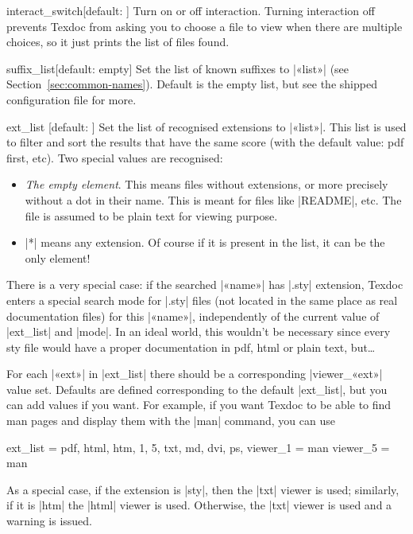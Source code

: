 \documentclass{texdoc-doc}
\begin{document}
\begin{confitem}{interact\_switch}{}[default: ]
Turn on or off interaction. Turning interaction off prevents Texdoc from asking
you to choose a file to view when there are multiple choices, so it just prints
the list of files found.
\end{confitem}

\begin{confitem}{suffix\_list}{}[default: empty]
Set the list of known suffixes to |«list»| (see
Section~\ref{sec:common-names}). Default is the empty list, but see the
shipped configuration file for more.
\end{confitem}

\begin{confitem}{ext\_list}
  {}[default: ]
Set the list of recognised extensions to |«list»|. This list is used to filter
and  sort the results that have the same score (with the default value: pdf
first, etc). Two special values are recognised:
%
\begin{itemize}
\item \emph{The empty element}. This means files without extensions, or more
  precisely without a dot in their name. This is meant for files like
  |README|, etc. The file is assumed to be plain text for viewing purpose.
\item |*| means any extension. Of course if it is present in the list, it
  can be the only element!
\end{itemize}

There is a very special case: if the searched |«name»| has |.sty| extension,
Texdoc enters a special search mode for |.sty| files (not located in the same
place as real documentation files) for this |«name»|, independently of the
current value of |ext_list| and |mode|. In an ideal world, this wouldn't be
necessary since every sty file would have a proper documentation in pdf, html
or plain text, but\dots

For each |«ext»| in |ext_list| there should be a corresponding |viewer_«ext»|
value set. Defaults are defined corresponding to the default |ext_list|, but
you can add values if you want. For example, if you want Texdoc to be able
to find man pages and display them with the |man| command, you can use
%
\begin{htcode}
ext_list = pdf, html, htm, 1, 5, txt, md, dvi, ps,
viewer_1 = man
viewer_5 = man
\end{htcode}

As a special case, if the extension is |sty|, then the |txt| viewer is used;
similarly, if it is |htm| the |html| viewer is used. Otherwise, the |txt|
viewer is used and a warning is issued.
\end{confitem}
\end{document}
